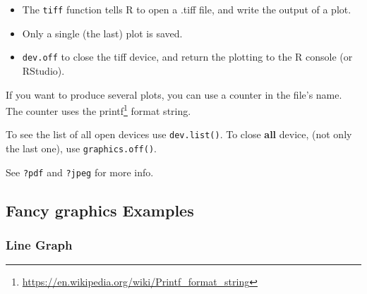 \documentclass[]{book}
\newenvironment{Shaded}{\begin{snugshade}}{\end{snugshade}}
\newcommand{\CommentTok}[1]{\textcolor[rgb]{0.56,0.35,0.01}{\textit{#1}}}
\newcommand{\DataTypeTok}[1]{\textcolor[rgb]{0.13,0.29,0.53}{#1}}
\newcommand{\DecValTok}[1]{\textcolor[rgb]{0.00,0.00,0.81}{#1}}
\newcommand{\KeywordTok}[1]{\textcolor[rgb]{0.13,0.29,0.53}{\textbf{#1}}}
\newcommand{\NormalTok}[1]{#1}
\newcommand{\StringTok}[1]{\textcolor[rgb]{0.31,0.60,0.02}{#1}}
\providecommand{\tightlist}{%
  \setlength{\itemsep}{0pt}\setlength{\parskip}{0pt}}
\renewcommand{\href}[2]{#2\footnote{\url{#1}}}
\theoremstyle{definition}
\theoremstyle{definition}
\theoremstyle{definition}
\theoremstyle{remark}
\begin{document}
\begin{itemize}
\tightlist
\item
  The \texttt{tiff} function tells R to open a .tiff file, and write the output of a plot.
\item
  Only a single (the last) plot is saved.
\item
  \texttt{dev.off} to close the tiff device, and return the plotting to the R console (or RStudio).
\end{itemize}

If you want to produce several plots, you can use a counter in the file's name. The counter uses the \href{https://en.wikipedia.org/wiki/Printf_format_string}{printf} format string.

\begin{Shaded}
\end{Shaded}

To see the list of all open devices use \texttt{dev.list()}.
To close \textbf{all} device, (not only the last one), use \texttt{graphics.off()}.

See \texttt{?pdf} and \texttt{?jpeg} for more info.

\hypertarget{fancy}{%
\subsection{Fancy graphics Examples}\label{fancy}}

\hypertarget{line-graph}{%
\subsubsection{Line Graph}\label{line-graph}}
\end{document}
